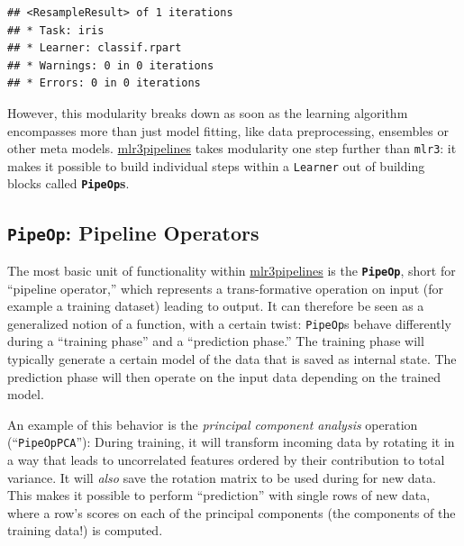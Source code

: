 \documentclass[
]{scrbook}
\newenvironment{Shaded}{\begin{snugshade}}{\end{snugshade}}
\newcommand{\DecValTok}[1]{\textcolor[rgb]{0.00,0.00,0.81}{#1}}
\newcommand{\FunctionTok}[1]{\textcolor[rgb]{0.00,0.00,0.00}{#1}}
\newcommand{\NormalTok}[1]{#1}
\newcommand{\OtherTok}[1]{\textcolor[rgb]{0.56,0.35,0.01}{#1}}
\newcommand{\SpecialCharTok}[1]{\textcolor[rgb]{0.00,0.00,0.00}{#1}}
\newcommand{\StringTok}[1]{\textcolor[rgb]{0.31,0.60,0.02}{#1}}
\renewenvironment{Shaded} {\begin{snugshade}\small} {\end{snugshade}}
\begin{document}
\begin{verbatim}
## <ResampleResult> of 1 iterations
## * Task: iris
## * Learner: classif.rpart
## * Warnings: 0 in 0 iterations
## * Errors: 0 in 0 iterations
\end{verbatim}

However, this modularity breaks down as soon as the learning algorithm encompasses more than just model fitting, like data preprocessing, ensembles or other meta models.
\href{https://cran.r-project.org/package=mlr3pipelines}{mlr3pipelines} takes modularity one step further than \texttt{mlr3}: it makes it possible to build individual steps within a \texttt{Learner} out of building blocks called \textbf{\texttt{PipeOp}s}.

\hypertarget{pipeop-pipeline-operators}{%
\subsection{\texorpdfstring{\texttt{PipeOp}: Pipeline Operators}{PipeOp: Pipeline Operators}}\label{pipeop-pipeline-operators}}

The most basic unit of functionality within \href{https://cran.r-project.org/package=mlr3pipelines}{mlr3pipelines} is the \textbf{\texttt{PipeOp}}, short for ``pipeline operator,'' which represents a trans-formative operation on input (for example a training dataset) leading to output.
It can therefore be seen as a generalized notion of a function, with a certain twist: \texttt{PipeOp}s behave differently during a ``training phase'' and a ``prediction phase.''
The training phase will typically generate a certain model of the data that is saved as internal state.
The prediction phase will then operate on the input data depending on the trained model.

An example of this behavior is the \emph{principal component analysis} operation (``\texttt{PipeOpPCA}''):
During training, it will transform incoming data by rotating it in a way that leads to uncorrelated features ordered by their contribution to total variance.
It will \emph{also} save the rotation matrix to be used during for new data.
This makes it possible to perform ``prediction'' with single rows of new data, where a row's scores on each of the principal components (the components of the training data!) is computed.

\begin{Shaded}
\end{Shaded}
\end{document}
